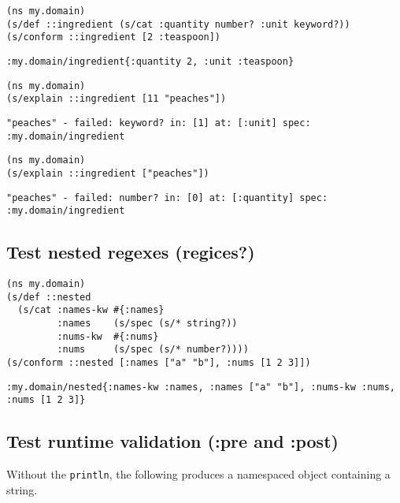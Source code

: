 \documentclass[10pt,oneside,x11names]{article}
\begin{document}
\begin{verbatim}
(ns my.domain)
(s/def ::ingredient (s/cat :quantity number? :unit keyword?))
(s/conform ::ingredient [2 :teaspoon])
\end{verbatim}

\begin{verbatim}
:my.domain/ingredient{:quantity 2, :unit :teaspoon}
\end{verbatim}


\begin{verbatim}
(ns my.domain)
(s/explain ::ingredient [11 "peaches"])
\end{verbatim}

\begin{verbatim}
"peaches" - failed: keyword? in: [1] at: [:unit] spec: :my.domain/ingredient
\end{verbatim}


\begin{verbatim}
(ns my.domain)
(s/explain ::ingredient ["peaches"])
\end{verbatim}

\begin{verbatim}
"peaches" - failed: number? in: [0] at: [:quantity] spec: :my.domain/ingredient
\end{verbatim}

\subsection{Test nested regexes (regices?)}
\label{sec:orge677f62}

\begin{verbatim}
(ns my.domain)
(s/def ::nested
  (s/cat :names-kw #{:names}
         :names    (s/spec (s/* string?))
         :nums-kw  #{:nums}
         :nums     (s/spec (s/* number?))))
(s/conform ::nested [:names ["a" "b"], :nums [1 2 3]])
\end{verbatim}

\begin{verbatim}
:my.domain/nested{:names-kw :names, :names ["a" "b"], :nums-kw :nums, :nums [1 2 3]}
\end{verbatim}

\subsection{Test runtime validation (:pre and :post)}
\label{sec:org48240ef}

Without the \texttt{println}, the following produces a namespaced object containing a string.
\end{document}
